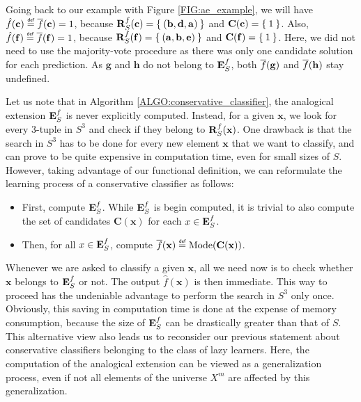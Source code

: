 \begin{testexample}
Going
back to our example with Figure \ref{FIG:ae_example}, we will have
$\hat{f}(\mathbf{c}) \eqdef \albl{\mathbf{c}} = 1$, because
$\mathbf{R}_{S}^{f}(\mathbf{c}) = \Set{(\mathbf{b}, \mathbf{d},\mathbf{a})}$ and
$\mathbf{C}(\mathbf{c}) = \Set{1}$. Also, $\hat{f}(\mathbf{f}) \eqdef
\albl{\mathbf{f}} = 1$, because $\mathbf{R}_{S}^{f}(\mathbf{f}) =
\Set{(\mathbf{a},\mathbf{b},\mathbf{e})}$ and $\mathbf{C}(\mathbf{f}) =
\Set{1}$. Here, we did not need to use the majority-vote procedure as there was
only one candidate solution for each prediction. As $\mathbf{g}$ and
$\mathbf{h}$ do not belong to $\mathbf{E}_{S}^{f}$, both $\overline{f}(\mathbf{g})$ and
$\overline{f}(\mathbf{h})$ stay undefined.
\end{testexample}

Let us note that in Algorithm \ref{ALGO:conservative_classifier}, the
analogical extension $\mathbf{E}_{S}^{f}$ is never explicitly computed. Instead, for a given
$\mathbf{x}$, we look for
every 3-tuple in $S^3$ and check if they belong to $\mathbf{R}_{S}^{f}(\mathbf{x})$. One drawback is
that the search in $S^3$ has to be done for every new element $\mathbf{x}$ that
we want to classify, and can prove to be quite expensive in computation time,
even for small sizes of $S$. However, taking advantage of our functional
definition, we can reformulate the learning process of a conservative
classifier as follows:

\begin{itemize}
\item First, compute $\mathbf{E}_{S}^{f}$. While $\mathbf{E}_{S}^{f}$ is begin computed, it is trivial to
  also compute the set of candidates $\mathbf{C}(\mathbf{x})$ for each $x \in
    \mathbf{E}_{S}^{f}$.
  \item Then, for all $x \in\mathbf{E}_{S}^{f}$, compute
    $\albl{\mathbf{x}} \eqdef \text{Mode}(\mathbf{C}(\mathbf{x}))$.
\end{itemize}
\noindent
Whenever we are asked to classify a given $\mathbf{x}$, all we need now is to
check whether $\mathbf{x}$ belongs to $\mathbf{E}_{S}^{f}$ or not. The output
$\hat{f}(\mathbf{x})$ is then immediate. This way to proceed has the undeniable
advantage to perform the search in $S^3$ only once. Obviously, this saving in
computation time is done at the expense of memory consumption, because the
size of $\mathbf{E}_{S}^{f}$ can be drastically greater than that of $S$. This alternative
view also leads us to reconsider our previous statement about conservative
classifiers belonging to the class of lazy learners. Here, the computation of
the analogical extension can be viewed as a generalization process, even if not
all elements of the universe $X^m$ are affected by this generalization.

